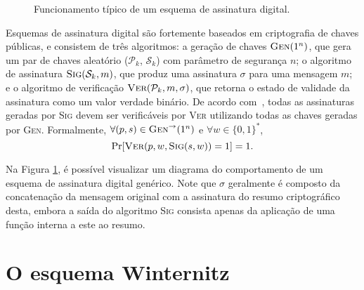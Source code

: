 \documentclass{article}
\newcommand{\pk}{$\mathcal{P}_k$}
\newcommand{\sk}{$\mathcal{S}_k$}
\newcommand{\hash}[2][]{\mathcal{H}^{#1}(#2)}
\newcommand{\concat}{\, \vert \vert \,}
\newcommand{\binwds}[1]{\{0, 1\}^{#1}}
\begin{document}
\begin{figure}[h]
  \centering
  \caption{Funcionamento típico de um esquema de assinatura digital.}
  \label{fig:2}
\end{figure}

Esquemas de assinatura digital são fortemente baseados em criptografia de
chaves públicas, e consistem de três algoritmos: a geração de chaves
$\textsc{Gen}(1^n)$, que gera um par de chaves aleatório (\pk{},
 \sk{}) com parâmetro de segurança $n$; o algoritmo de assinatura
$\textsc{Sig}(\text{\sk{}}, m)$, que produz uma assinatura $\sigma$ para uma
mensagem $m$; e o algoritmo de verificação $\textsc{Ver}(\text{\pk{}}, m,
\sigma)$, que retorna o estado de validade da assinatura como um valor verdade
binário. De acordo com~\cite{Goldreich:2004:FCV:975541}, todas as assinaturas
geradas por \textsc{Sig} devem ser verificáveis por \textsc{Ver} utilizando
todas as chaves geradas por \textsc{Gen}. Formalmente, $\forall (p, s) \in
\textsc{Gen}^{\rightarrow}(1^n)$ e $\forall w \in \binwds{*}$,
\begin{equation}
    \text{Pr}[\textsc{Ver}(p, w, \textsc{Sig}(s, w)) = 1] = 1.
\end{equation}

Na Figura \ref{fig:2}, é possível visualizar um diagrama do comportamento de
um esquema de assinatura digital genérico. Note que $\sigma$ geralmente é
composto da concatenação da mensagem original com a assinatura do resumo
criptográfico desta, embora a saída do algoritmo \textsc{Sig} consista apenas
da aplicação de uma função interna a este ao resumo.

\section{O esquema Winternitz}
\end{document}
